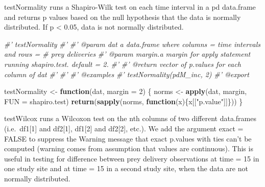 \documentclass[]{article}
\newenvironment{Shaded}{\begin{snugshade}}{\end{snugshade}}
\newcommand{\CommentTok}[1]{\textcolor[rgb]{0.56,0.35,0.01}{\textit{#1}}}
\newcommand{\ControlFlowTok}[1]{\textcolor[rgb]{0.13,0.29,0.53}{\textbf{#1}}}
\newcommand{\DataTypeTok}[1]{\textcolor[rgb]{0.13,0.29,0.53}{#1}}
\newcommand{\DecValTok}[1]{\textcolor[rgb]{0.00,0.00,0.81}{#1}}
\newcommand{\KeywordTok}[1]{\textcolor[rgb]{0.13,0.29,0.53}{\textbf{#1}}}
\newcommand{\NormalTok}[1]{#1}
\newcommand{\OperatorTok}[1]{\textcolor[rgb]{0.81,0.36,0.00}{\textbf{#1}}}
\newcommand{\OtherTok}[1]{\textcolor[rgb]{0.56,0.35,0.01}{#1}}
\newcommand{\StringTok}[1]{\textcolor[rgb]{0.31,0.60,0.02}{#1}}
\begin{document}
testNormality runs a Shapiro-Wilk test on each time interval in a pd
data.frame and returns p values based on the null hypothesis that the
data is normally distributed. If p \textless{} 0.05, data is not
normally distributed.

\begin{Shaded}
\begin{Highlighting}[]
\CommentTok{#' testNormality}
\CommentTok{#' }
\CommentTok{#' @param dat a data.frame where columns = time intervals and rows = # prey deliveries}
\CommentTok{#' @param margin.a margin for apply statement running shapiro.test. default = 2.}
\CommentTok{#'}
\CommentTok{#' @return vector of p.values for each column of dat}
\CommentTok{#' }
\CommentTok{#'}
\CommentTok{#' @examples}
\CommentTok{#'    testNormality(pdM_inc, 2)}
\CommentTok{#' @export}

\NormalTok{testNormality <-}\StringTok{ }\ControlFlowTok{function}\NormalTok{(dat, }\DataTypeTok{margin =} \DecValTok{2}\NormalTok{) \{}
\NormalTok{  norms <-}\StringTok{ }\KeywordTok{apply}\NormalTok{(dat, margin, }\DataTypeTok{FUN =}\NormalTok{ shapiro.test)}
  \KeywordTok{return}\NormalTok{(}\KeywordTok{sapply}\NormalTok{(norms, }\ControlFlowTok{function}\NormalTok{(x)\{x[[}\StringTok{"p.value"}\NormalTok{]]\}))}
\NormalTok{\}}
\end{Highlighting}
\end{Shaded}

testWilcox runs a Wilcoxon test on the nth columns of two different
data.frames (i.e.~df1{[}1{]} and df2{[}1{]}, df1{[}2{]} and df2{[}2{]},
etc.). We add the argument exact = FALSE to suppress the Warning message
that exact p.values with ties can't be computed (warning comes from
assumption that values are continuous). This is useful in testing for
difference between prey delivery observations at time = 15 in one study
site and at time = 15 in a second study site, when the data are not
normally distributed.

\begin{Shaded}
\end{Shaded}
\end{document}
